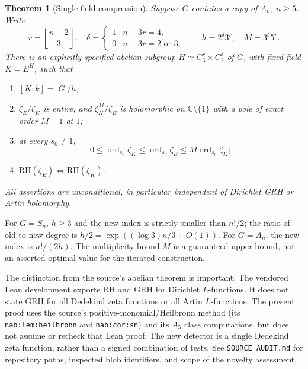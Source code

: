 \documentclass[11pt]{article}
\newtheorem{theorem}{Theorem}[section]
\theoremstyle{remark}\newtheorem{remark}[theorem]{Remark}
\newcommand{\ord}{\operatorname{ord}}
\newcommand{\RH}{\mathrm{RH}}
\newcommand{\C}{\mathbb C}
\begin{document}
\begin{theorem}[Single-field compression]\label{thm:main}
Suppose $G$ contains a copy of $A_n$, $n\ge5$. Write
\[
 r=\left\lfloor\frac{n-2}{3}\right\rfloor,\quad
 \delta=\begin{cases}1& n-3r=4,\\0& n-3r=2\text{ or }3,\end{cases}
 \qquad h=2^\delta3^r,\quad M=3^\delta5^r.
\]
There is an explicitly specified abelian subgroup $H\simeq C_3^r\times C_2^\delta$ of
$G$, with fixed field $K=E^H$, such that
\begin{enumerate}[label=\textup{(\roman*)},nosep]
\item $[K:k]=|G|/h$;
\item $\zeta_E/\zeta_K$ is entire, and $\zeta_K^M/\zeta_E$ is holomorphic
on $\C\setminus\{1\}$ with a pole of exact order $M-1$ at $1$;
\item at every $s_0\ne1$,
\begin{equation}\label{eq:mult}
 0\le \ord_{s_0}\zeta_K\le\ord_{s_0}\zeta_E\le M\ord_{s_0}\zeta_K;
\end{equation}
\item $\RH(\zeta_E)\Longleftrightarrow\RH(\zeta_K)$.
\end{enumerate}
All assertions are unconditional, in particular independent of Dirichlet GRH or
Artin holomorphy.
\end{theorem}

For $G=S_n$, $h\ge3$ and the new index is strictly smaller than $n!/2$; the ratio
of old to new degree is $h/2=\exp((\log3)n/3+O(1))$. For $G=A_n$, the new
index is $n!/(2h)$. The multiplicity bound $M$ is a guaranteed upper bound,
not an asserted optimal value for the iterated construction.

The distinction from the source's abelian theorem is important. The vendored
Lean development exports RH and GRH for Dirichlet $L$-functions. It does not
state GRH for all Dedekind zeta functions or all Artin $L$-functions. The present
proof uses the source's positive-monomial/Heilbronn method (its
\texttt{nab:lem:heilbronn} and \texttt{nab:cor:sn}) and its $A_5$ class computations,
but does not assume or recheck that Lean proof. The new detector is a single
Dedekind zeta function, rather than a signed combination of tests. See
\texttt{SOURCE\_AUDIT.md} for repository paths, inspected blob identifiers,
and scope of the novelty assessment.
\end{document}
